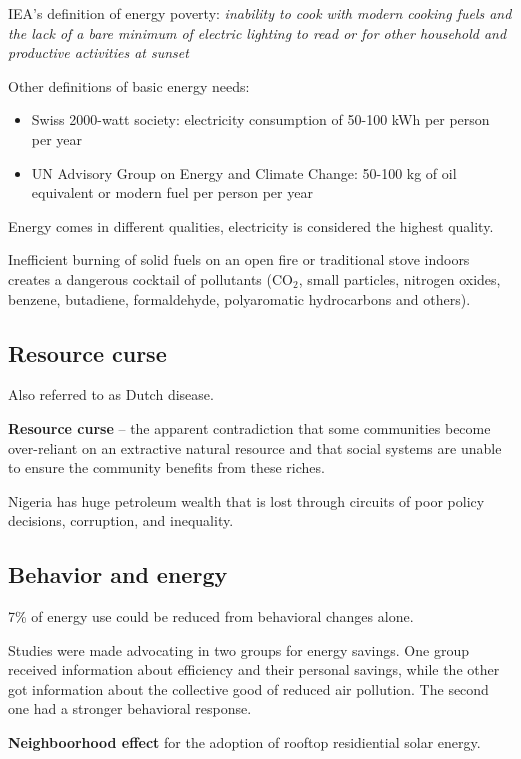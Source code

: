 IEA's definition of energy poverty: \textit{inability to cook with modern
cooking fuels and the lack of a bare minimum of electric lighting to read or
for other household and productive activities at sunset}

Other definitions of basic energy needs:
\begin{itemize}
	\item Swiss 2000-watt society: electricity consumption of 50-100 kWh
	per person per year
	\item UN Advisory Group on Energy and Climate Change: 50-100 kg of oil
	equivalent or modern fuel per person per year
\end{itemize}

Energy comes in different qualities, electricity is considered the highest
quality.

Inefficient burning of solid fuels on an open fire or traditional stove indoors
creates a dangerous cocktail of pollutants (CO$_2$, small particles, nitrogen
oxides, benzene, butadiene, formaldehyde, polyaromatic hydrocarbons and
others).

\subsection{Resource curse}

Also referred to as Dutch disease.

\textbf{Resource curse} -- the apparent contradiction that some communities
become over-reliant on an extractive natural resource and that social systems
are unable to ensure the community benefits from these riches.

Nigeria has huge petroleum wealth that is lost through circuits of poor policy
decisions, corruption, and inequality.

\subsection{Behavior and energy}

7\% of energy use could be reduced from behavioral changes alone.

Studies were made advocating in two groups for energy savings. One group
received information about efficiency and their personal savings, while the
other got information about the collective good of reduced air pollution. The
second one had a stronger behavioral response.

\textbf{Neighboorhood effect} for the adoption of rooftop residiential solar
energy.

